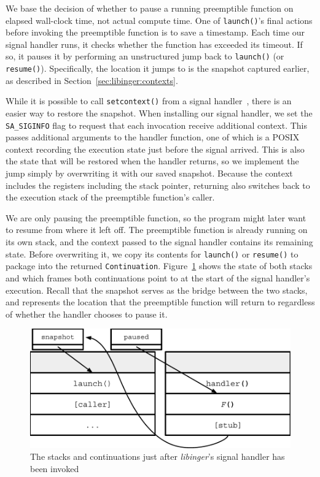 We base the decision of whether to pause a running preemptible function on elapsed
wall-clock time, not actual compute time.  One of \texttt{launch()}'s final actions
before invoking the preemptible function is to save a timestamp.  Each time our
signal handler runs, it checks whether the function has exceeded its timeout.  If so,
it pauses it by performing an unstructured jump back to \texttt{launch()} (or
\texttt{resume()}).  Specifically, the location it jumps to is the snapshot captured
earlier, as described in Section~\ref{sec:libinger:contexts}.

While it is possible to call \texttt{setcontext()} from a signal
handler~\cite{getcontext-manpage}, there is an easier way to restore the snapshot.
When installing our signal handler, we set the \texttt{SA\_SIGINFO} flag to request
that each invocation receive additional context.  This passes additional arguments to
the handler function, one of which is a POSIX context recording the execution state
just before the signal arrived.  This is also the state that will be restored when
the handler returns, so we implement the jump simply by overwriting it with our saved
snapshot.  Because the context includes the registers including the stack pointer,
returning also switches back to the execution stack of the preemptible function's
caller.

We are only pausing the preemptible function, so the program might later want to
resume from where it left off.  The preemptible function is already running on its
own stack, and the context passed to the signal handler contains its remaining state.
Before overwriting it, we copy its contents for \texttt{launch()} or
\texttt{resume()} to package into the returned \texttt{Continuation}.
Figure~\ref{fig:twostackscontinuations} shows the state of both stacks and which
frames both continuations point to at the start of the signal handler's execution.
Recall that the snapshot serves as the bridge between the two stacks, and represents
the location that the preemptible function will return to regardless of whether the
handler chooses to pause it.

\begin{figure}
\includegraphics[width=\columnwidth]{figs/twostacks_twocontinuations}
\caption{The stacks and continuations just after \textit{libinger}'s signal handler has been invoked}
\label{fig:twostackscontinuations}
\end{figure}


